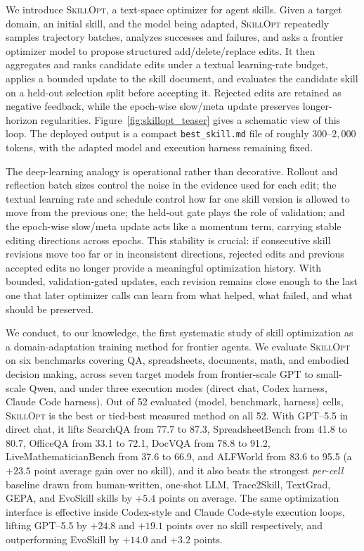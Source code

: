 \documentclass{llmxive}
\providecommand{\ourmethod}{\textsc{SkillOpt}\xspace}
\begin{document}
We introduce \ourmethod{}, a text-space optimizer for agent skills. Given a target domain, an initial skill, and the model being adapted, \ourmethod{} repeatedly samples trajectory batches, analyzes successes and failures, and asks a frontier optimizer model to propose structured add/delete/replace edits. It then aggregates and ranks candidate edits under a textual learning-rate budget, applies a bounded update to the skill document, and evaluates the candidate skill on a held-out selection split before accepting it. Rejected edits are retained as negative feedback, while the epoch-wise slow/meta update preserves longer-horizon regularities. Figure~\ref{fig:skillopt_teaser} gives a schematic view of this loop. The deployed output is a compact \mbox{\texttt{best\_skill.md}} file of roughly $300$--$2{,}000$ tokens, with the adapted model and execution harness remaining fixed.

The deep-learning analogy is operational rather than decorative. Rollout and reflection batch sizes control the noise in the evidence used for each edit; the textual learning rate and schedule control how far one skill version is allowed to move from the previous one; the held-out gate plays the role of validation; and the epoch-wise slow/meta update acts like a momentum term, carrying stable editing directions across epochs. This stability is crucial: if consecutive skill revisions move too far or in inconsistent directions, rejected edits and previous accepted edits no longer provide a meaningful optimization history. With bounded, validation-gated updates, each revision remains close enough to the last one that later optimizer calls can learn from what helped, what failed, and what should be preserved.


We conduct, to our knowledge, the first systematic study of skill optimization as a domain-adaptation training method for frontier agents. We evaluate \ourmethod{} on six benchmarks covering QA, spreadsheets, documents, math, and embodied decision making, across seven target models from frontier-scale GPT to small-scale Qwen, and under three execution modes (direct chat, Codex harness, Claude Code harness). Out of 52 evaluated (model, benchmark, harness) cells, \ourmethod{} is the best or tied-best measured method on all 52. With GPT--5.5 in direct chat, it lifts SearchQA from 77.7 to 87.3, SpreadsheetBench from 41.8 to 80.7, OfficeQA from 33.1 to 72.1, DocVQA from 78.8 to 91.2, LiveMathematicianBench from 37.6 to 66.9, and ALFWorld from 83.6 to 95.5 (a $+23.5$ point average gain over no skill), and it also beats the strongest \emph{per-cell} baseline drawn from human-written, one-shot LLM, Trace2Skill, TextGrad, GEPA, and EvoSkill skills by $+5.4$ points on average. The same optimization interface is effective inside Codex-style and Claude Code-style execution loops, lifting GPT--5.5 by $+24.8$ and $+19.1$ points over no skill respectively, and outperforming EvoSkill by $+14.0$ and $+3.2$ points.
\end{document}
